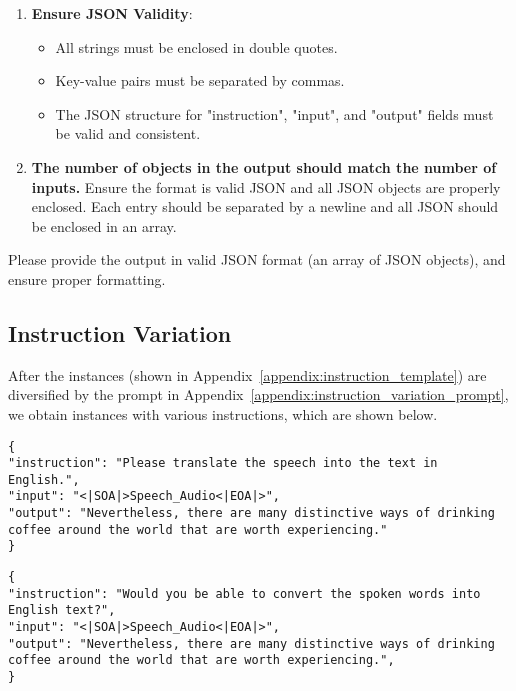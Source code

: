 \begin{tcolorbox}[
    colframe=black,  %
    colback=white,   %
    boxrule=0.5mm,    %
    arc=0mm,          %
    sharp corners,     %
    breakable
]
\begin{enumerate}
    \item \textbf{Ensure JSON Validity}:
    \begin{itemize}
        \item All strings must be enclosed in double quotes.
        \item Key-value pairs must be separated by commas.
        \item The JSON structure for "instruction", "input", and "output" fields must be valid and consistent.
    \end{itemize}

    \item \textbf{The number of objects in the output should match the number of inputs.} Ensure the format is valid JSON and all JSON objects are properly enclosed. Each entry should be separated by a newline and all JSON should be enclosed in an array.
\end{enumerate}

Please provide the output in valid JSON format (an array of JSON objects), and ensure proper formatting.
\end{tcolorbox}


\subsection{Instruction Variation}\label{appendix:instruction_variation_example}

After the instances (shown in Appendix~\ref{appendix:instruction_template}) are diversified by the prompt in Appendix~\ref{appendix:instruction_variation_prompt}, we obtain instances with various instructions, which are shown below.

\begin{tcolorbox}[colback=white, colframe=black, boxrule=0.2mm, arc=0mm, title=Speech-to-Text Translation Task Template]
\begin{lstlisting}[basicstyle=\ttfamily, breaklines=true]
{
"instruction": "Please translate the speech into the text in English.", 
"input": "<|SOA|>Speech_Audio<|EOA|>", 
"output": "Nevertheless, there are many distinctive ways of drinking coffee around the world that are worth experiencing."
}
\end{lstlisting}
\end{tcolorbox}


\begin{tcolorbox}[colback=white, colframe=black, boxrule=0.2mm, arc=0mm, title=Speech-to-Text Translation Insutrction Variation Example 1]
\begin{lstlisting}[basicstyle=\ttfamily, breaklines=true]
{
"instruction": "Would you be able to convert the spoken words into English text?", 
"input": "<|SOA|>Speech_Audio<|EOA|>", 
"output": "Nevertheless, there are many distinctive ways of drinking coffee around the world that are worth experiencing.", 
}
\end{lstlisting}
\end{tcolorbox}

